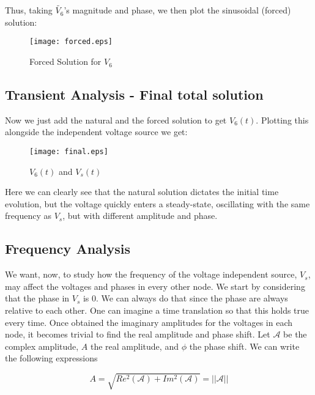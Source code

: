 Thus, taking $\tilde{V_6}$'s magnitude and phase, we then plot the sinusoidal (forced) solution:

\begin{figure}[H]
  \centering
  \texttt{[image: forced.eps]}
  \caption{Forced Solution for $V_{6}$}
  \label{fig:OctaveForcedSolution}
\end{figure}

\subsection{Transient Analysis - Final total solution}
Now we just add the natural and the forced solution to get $V_6(t)$. Plotting this alongside the independent voltage source we get:

\begin{figure}[H]
  \centering
  \texttt{[image: final.eps]}
  \caption{$V_6(t)$ and $V_s(t)$}
  \label{fig:OctaveFinalSolution}
\end{figure}

Here we can clearly see that the natural solution dictates the initial time evolution, but the voltage quickly enters a steady-state, oscillating with the same frequency as $V_s$, but
with different amplitude and phase.


\subsection{Frequency Analysis}

We want, now, to study how the frequency of the voltage independent source, $V_s$, may affect the voltages and phases in every other node.
We start by considering that the phase in $V_s$ is 0. We can always do that since the phase are always relative to each other. One can imagine a time translation so that this holds true every time.
Once obtained the imaginary amplitudes for the voltages in each node, it becomes trivial to find the real amplitude and phase shift.
Let $\mathcal{A}$ be the complex amplitude, $A$ the real amplitude, and $\phi$ the phase shift. We can write the following expressions

\begin{center}
    \begin{equation}
        A=\sqrt{Re^2(\mathcal{A})+Im^2(\mathcal{A})}=||\mathcal{A}||
    \end{equation}
\end{center}

